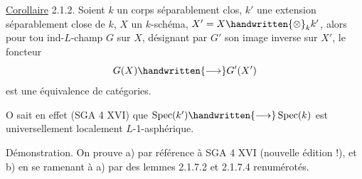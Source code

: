 \reversemarginpar
{}
\normalmarginpar
\uline{Corollaire} 2.1.2. Soient $k$ un corps séparablement clos, $k'$ une extension séparablement close de $k$, $X$ un $k$-schéma, $X'=X\handwritten{\otimes}_k k'$, alors pour tou  ind-\uline{$L$}-champ $G$ sur $X$, désignant par $G'$ son image inverse sur $X'$, le foncteur
\[
G(X)\handwritten{\longrightarrow}G'(X')
\]
est une équivalence de catégories.

O sait en effet (SGA 4 XVI\quad\quad) que $\operatorname{Spec}(k')\handwritten{\longrightarrow}\operatorname{Spec}(k)$ est universellement localement \uline{$L$}-1-asphérique.

Démonstration. On prouve a) par référence à SGA 4 XVI (nouvelle édition !), et b) en se ramenant à a) par des lemmes 2.1.7.2 et 2.1.7.4 renumérotés.
\par\noindent\hfill\begin{minipage}{.70\linewidth}
\end{minipage}
